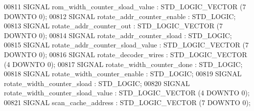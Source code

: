 \begin{DoxyCode}
{00811      \textcolor{keywordflow}{SIGNAL}  \textcolor{vhdlchar}{rom_width_counter_sload_value} \textcolor{vhdlchar}{:}    \textcolor{comment}{STD\_LOGIC\_VECTOR} \textcolor{vhdlchar}{(}\textcolor{vhdllogic}{}\textcolor{vhdllogic}{7} \textcolor{keywordflow}{DOWNTO} \textcolor{vhdllogic}{}\textcolor{vhdllogic}{0}\textcolor{vhdlchar}{)};
00812      \textcolor{keywordflow}{SIGNAL}  \textcolor{vhdlchar}{rotate_addr_counter_enable} \textcolor{vhdlchar}{:}   \textcolor{comment}{STD\_LOGIC};
00813      \textcolor{keywordflow}{SIGNAL}  \textcolor{vhdlchar}{rotate_addr_counter_out} \textcolor{vhdlchar}{:}  \textcolor{comment}{STD\_LOGIC\_VECTOR} \textcolor{vhdlchar}{(}\textcolor{vhdllogic}{}\textcolor{vhdllogic}{7} \textcolor{keywordflow}{DOWNTO} \textcolor{vhdllogic}{}\textcolor{vhdllogic}{0}\textcolor{vhdlchar}{)};
00814      \textcolor{keywordflow}{SIGNAL}  \textcolor{vhdlchar}{rotate_addr_counter_sload} \textcolor{vhdlchar}{:}    \textcolor{comment}{STD\_LOGIC};
00815      \textcolor{keywordflow}{SIGNAL}  \textcolor{vhdlchar}{rotate_addr_counter_sload_value} \textcolor{vhdlchar}{:}  \textcolor{comment}{STD\_LOGIC\_VECTOR} \textcolor{vhdlchar}{(}\textcolor{vhdllogic}{}\textcolor{vhdllogic}{7} \textcolor{keywordflow}{DOWNTO} \textcolor{vhdllogic}{}\textcolor{vhdllogic}{0}\textcolor{vhdlchar}{)};
00816      \textcolor{keywordflow}{SIGNAL}  \textcolor{vhdlchar}{rotate_decoder_wires} \textcolor{vhdlchar}{:} \textcolor{comment}{STD\_LOGIC\_VECTOR} \textcolor{vhdlchar}{(}\textcolor{vhdllogic}{}\textcolor{vhdllogic}{4} \textcolor{keywordflow}{DOWNTO} \textcolor{vhdllogic}{}\textcolor{vhdllogic}{0}\textcolor{vhdlchar}{)};
00817      \textcolor{keywordflow}{SIGNAL}  \textcolor{vhdlchar}{rotate_width_counter_done} \textcolor{vhdlchar}{:}    \textcolor{comment}{STD\_LOGIC};
00818      \textcolor{keywordflow}{SIGNAL}  \textcolor{vhdlchar}{rotate_width_counter_enable} \textcolor{vhdlchar}{:}  \textcolor{comment}{STD\_LOGIC};
00819      \textcolor{keywordflow}{SIGNAL}  \textcolor{vhdlchar}{rotate_width_counter_sload} \textcolor{vhdlchar}{:}   \textcolor{comment}{STD\_LOGIC};
00820      \textcolor{keywordflow}{SIGNAL}  \textcolor{vhdlchar}{rotate_width_counter_sload_value} \textcolor{vhdlchar}{:} \textcolor{comment}{STD\_LOGIC\_VECTOR} \textcolor{vhdlchar}{(}\textcolor{vhdllogic}{}\textcolor{vhdllogic}{4} \textcolor{keywordflow}{DOWNTO} \textcolor{vhdllogic}{}\textcolor{vhdllogic}{0}\textcolor{vhdlchar}{)};
00821      \textcolor{keywordflow}{SIGNAL}  \textcolor{vhdlchar}{scan_cache_address} \textcolor{vhdlchar}{:}   \textcolor{comment}{STD\_LOGIC\_VECTOR} \textcolor{vhdlchar}{(}\textcolor{vhdllogic}{}\textcolor{vhdllogic}{7} \textcolor{keywordflow}{DOWNTO} \textcolor{vhdllogic}{}\textcolor{vhdllogic}{0}\textcolor{vhdlchar}{)};
}
\end{DoxyCode}
